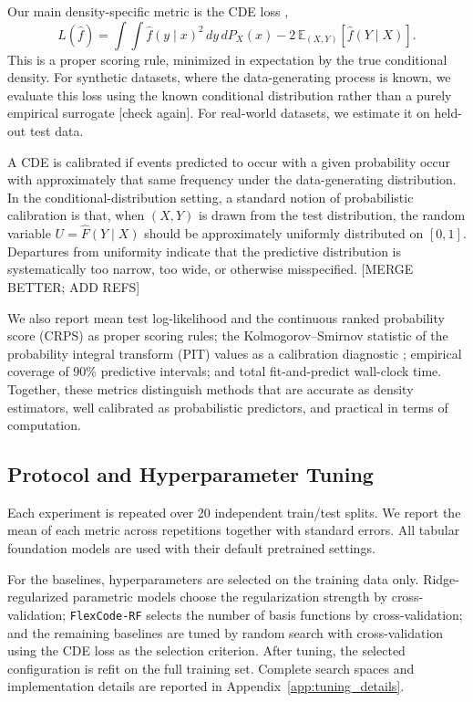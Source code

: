 \documentclass{article}
\newcommand{\method}[1]{\texttt{#1}}
\newcommand{\E}{\mathbb{E}}
\begin{document}
Our main density-specific metric is the CDE loss
\citep{izbicki2017converting},
\begin{equation}
  L(\hat f)=\int\!\!\int \hat f(y\mid x)^2\,dy\,dP_X(x)
  -2\,\E_{(X,Y)}[\hat f(Y\mid X)].
  \label{eq:cde_loss}
\end{equation}
This is a proper scoring rule, minimized in expectation by the true conditional
density. For synthetic datasets, where the data-generating process is known, we
evaluate this loss using the known conditional distribution rather than a purely
empirical surrogate [check again]. For real-world datasets, we estimate it on held-out test
data.


A CDE is calibrated if events predicted to occur with a given probability occur with approximately that same frequency under the data-generating distribution. In the conditional-distribution setting, a standard notion of probabilistic calibration is that, when $(X,Y)$ is drawn from the test distribution, the random variable $
U = \hat F(Y \mid X)$ 
should be approximately uniformly distributed on $[0,1]$. Departures from uniformity indicate that the predictive distribution is systematically too narrow, too wide, or otherwise misspecified.  [MERGE BETTER; ADD REFS]

We also report mean test log-likelihood and the continuous ranked probability
score (CRPS) \citep{gneiting2007strictly} as proper scoring rules; the
Kolmogorov--Smirnov statistic of the probability integral transform (PIT) values
as a calibration diagnostic \citep{zhao2021diagnostics}; empirical coverage  of 90\% predictive intervals; and total fit-and-predict wall-clock
time. Together, these metrics distinguish methods that are accurate as density
estimators, well calibrated as probabilistic predictors, and practical in terms
of computation.

\subsection{Protocol and Hyperparameter Tuning}
\label{sec:protocol}

Each experiment is repeated over 20 independent train/test splits. We report the
mean of each metric across repetitions together with standard errors. All
tabular foundation models are used with their default pretrained settings.

For the baselines, hyperparameters are selected on the training data only.
Ridge-regularized parametric models choose the regularization strength by
cross-validation; \method{FlexCode-RF} selects the number of basis functions by
cross-validation; and the remaining baselines are tuned by random search with
cross-validation using the CDE loss as the selection criterion. After tuning,
the selected configuration is refit on the full training set. Complete search
spaces and implementation details are reported in
Appendix~\ref{app:tuning_details}.
\end{document}
